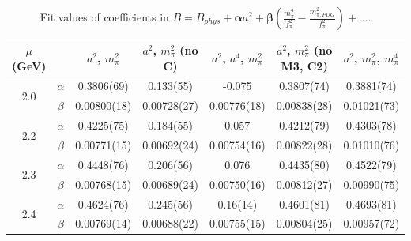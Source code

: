 \documentclass[12pt]{extarticle}
\begin{document}
\begin{table}[h!]
\begin{center}
\begin{tabular}{|c c|c|c|c|c|c|}
\hline
$\mu$ (GeV) &  & $a^2$, $m_\pi^2$& $a^2$, $m_\pi^2$ (no C)& $a^2$, $a^4$, $m_\pi^2$& $a^2$, $m_\pi^2$ (no M3, C2)& $a^2$, $m_\pi^2$, $m_\pi^4$\\
\hline
\multirow{2}{0.5in}{2.0} & $\alpha$ & 0.3806(69)& 0.133(55)& -0.075& 0.3807(74)& 0.3881(74)\\
 & $\beta$ & 0.00800(18)& 0.00728(27)& 0.00776(18)& 0.00838(28)& 0.01021(73)\\
\hline
\multirow{2}{0.5in}{2.2} & $\alpha$ & 0.4225(75)& 0.184(55)& 0.057& 0.4212(79)& 0.4303(78)\\
 & $\beta$ & 0.00771(15)& 0.00692(24)& 0.00754(16)& 0.00822(28)& 0.01010(76)\\
\hline
\multirow{2}{0.5in}{2.3} & $\alpha$ & 0.4448(76)& 0.206(56)& 0.076& 0.4435(80)& 0.4522(79)\\
 & $\beta$ & 0.00768(15)& 0.00689(24)& 0.00750(16)& 0.00812(27)& 0.00990(75)\\
\hline
\multirow{2}{0.5in}{2.4} & $\alpha$ & 0.4624(76)& 0.245(56)& 0.16(14)& 0.4601(81)& 0.4693(81)\\
 & $\beta$ & 0.00769(14)& 0.00688(22)& 0.00755(15)& 0.00804(25)& 0.00957(72)\\
\hline
\end{tabular}
\caption{Fit values of coefficients in $B = B_{phys} + \mathbf{\alpha} a^2 + \mathbf{\beta}\left(\frac{m_\pi^2}{f_\pi^2}-\frac{m_{\pi,PDG}^2}{f_\pi^2}\right) + \ldots$.}
\end{center}
\end{table}




















\clearpage
\end{document}
